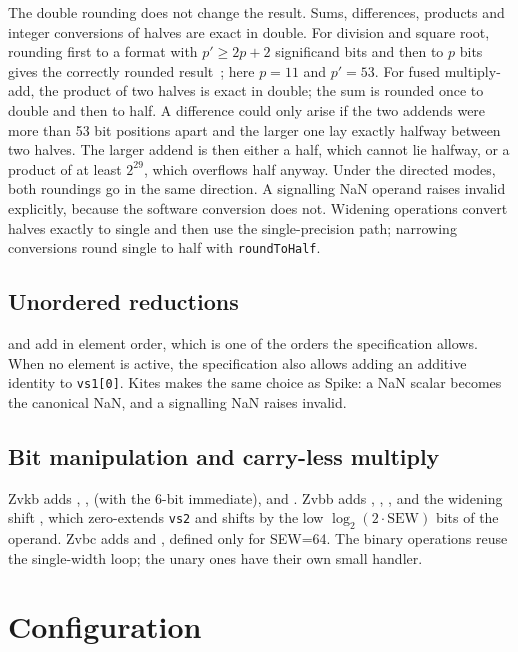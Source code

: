 \documentclass[11pt]{article}
\begin{document}
The double rounding does not change the result. Sums, differences, products and integer
conversions of halves are exact in double. For division and square root, rounding first to a
format with $p' \ge 2p+2$ significand bits and then to $p$ bits gives the correctly rounded
result~\cite{figueroa}; here $p=11$ and $p'=53$. For fused multiply-add, the product of two halves is exact in
double; the sum is rounded once to double and then to half. A difference could only arise if the
two addends were more than 53 bit positions apart and the larger one lay exactly halfway between
two halves. The larger addend is then either a half, which cannot lie halfway, or a product of at
least $2^{29}$, which overflows half anyway. Under the directed modes, both roundings go in the
same direction. A signalling NaN operand raises invalid explicitly, because the software
conversion does not. Widening operations convert halves exactly to single and then use the
single-precision path; narrowing conversions round single to half with \texttt{roundToHalf}.

\subsection{Unordered reductions}
 and  add in element order, which is one of the orders the
specification allows. When no element is active, the specification also allows adding an
additive identity to \texttt{vs1[0]}. Kites makes the same choice as Spike: a NaN scalar becomes
the canonical NaN, and a signalling NaN raises invalid.

\subsection{Bit manipulation and carry-less multiply}
Zvkb adds , ,  (with the 6-bit  immediate),
 and . Zvbb adds , , , 
and the widening shift , which zero-extends \texttt{vs2} and shifts by the low
$\log_2(2\cdot\mathrm{SEW})$ bits of the operand. Zvbc adds  and ,
defined only for SEW=64. The binary operations reuse the single-width loop; the unary ones have
their own small handler.

\section{Configuration}\label{sec:config}
\end{document}
